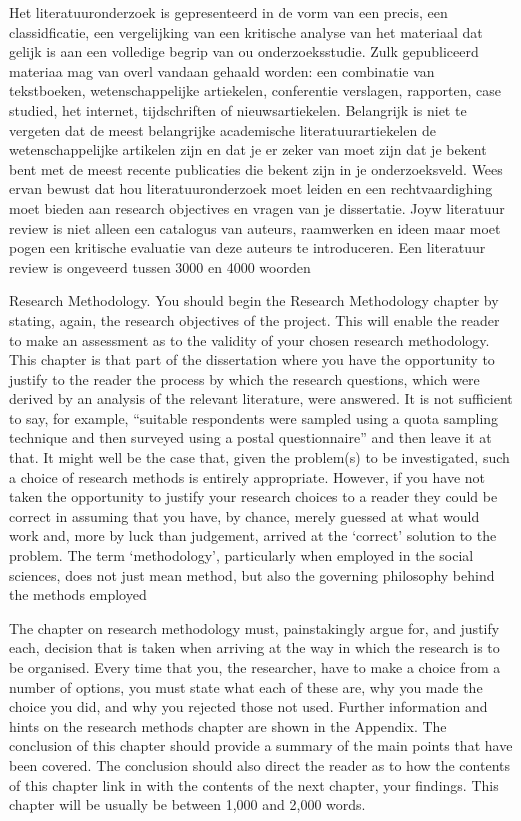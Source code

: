 			
			Het literatuuronderzoek is gepresenteerd in de vorm van een precis, een classidficatie, een vergelijking van een kritische analyse van het materiaal dat gelijk is aan een volledige begrip van ou onderzoeksstudie. Zulk gepubliceerd materiaa mag van overl vandaan gehaald worden: een combinatie van tekstboeken, wetenschappelijke artiekelen, conferentie verslagen, rapporten, case studied, het internet, tijdschriften of nieuwsartiekelen. Belangrijk is niet te vergeten dat de meest belangrijke academische literatuurartiekelen de wetenschappelijke artikelen zijn en dat je er zeker van moet zijn dat je bekent bent met de meest recente publicaties die bekent zijn in je onderzoeksveld.
			Wees ervan bewust dat hou literatuuronderzoek  moet leiden en een rechtvaardighing moet bieden aan research objectives en  vragen van je dissertatie. Joyw literatuur review is niet alleen een catalogus van auteurs, raamwerken en ideen maar moet pogen een kritische evaluatie van deze auteurs te introduceren.
			Een literatuur review is ongeveerd tussen 3000 en 4000 woorden
			
			
			
			
			Research Methodology.
			You should begin the Research Methodology chapter by stating, again, the research objectives of the project. This will enable the reader to make an assessment as to the validity of your chosen research methodology.
			This chapter is that part of the dissertation where you have the opportunity to justify to the reader the process by which the research questions, which were derived by an analysis of the relevant literature, were answered. It is not sufficient to say, for example, “suitable respondents were sampled using a quota sampling technique and then surveyed using a postal questionnaire” and then leave it at that. It might well be the case that, given the problem(s) to be investigated, such a choice of research methods is entirely appropriate. However, if you have not taken the opportunity to justify your  research choices to a reader they could be correct in assuming that you have, by chance, merely guessed at what would work and, more by luck than  judgement, arrived at the ‘correct’ solution to the problem.
			The term ‘methodology’, particularly when employed in the social sciences, does not just mean method, but also the governing philosophy behind the methods employed
			
			The chapter on research methodology must, painstakingly argue for,  and justify each, decision that is taken when arriving at the way in which the research is to be organised. Every time that you, the researcher, have to make a choice from a number of options, you must state what each of these are, why you made the choice you did, and why you rejected those not used.
			Further information and hints on the research methods chapter are shown in the Appendix.
			The conclusion of this chapter should provide a summary of the main points that have been covered. The conclusion should also direct the reader as to how the contents of this chapter link in with the contents of the next chapter, your findings. This chapter will be usually be between 1,000 and 2,000 words.
			
